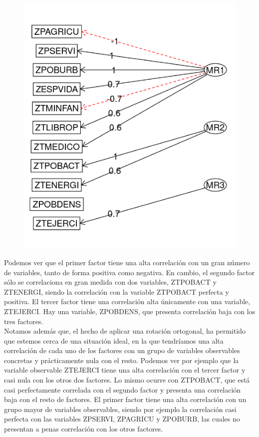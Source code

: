 \documentclass[11pt,a4paper]{article}
\begin{document}
                     \begin{figure}[H]
    	    \centering
    	    \includegraphics[scale=0.45]{plotaf.png}
    	    \caption{}
    	    \label{plotaf}
    	\end{figure}
    	
    Podemos ver que el primer factor tiene una alta correlación con un gran número de variables, tanto de forma positiva como negativa. En cambio, el segundo factor sólo se correlaciona en gran medida con dos variables, ZTPOBACT y ZTENERGI, siendo la correlación con la variable ZTPOBACT perfecta y positiva. El tercer factor tiene una correlación alta únicamente con una variable, ZTEJERCI. Hay una variable, ZPOBDENS, que presenta correlación baja con los tres factores. \\
    
    
     Notamos además que, el hecho de aplicar una rotación ortogonal, ha permitido que estemos cerca de una situación ideal, en la que tendríamos una alta correlación de cada uno de los factores con un grupo de variables observables concretas y prácticamente nula con el resto. Podemos ver por ejemplo que la variable observable ZTEJERCI tiene una alta correlación con el tercer factor y casi nula con los otros dos factores. Lo mismo ocurre con ZTPOBACT, que está casi perfectamente correlada con el segundo factor y presenta una correlación baja con el resto de factores. El primer factor tiene una alta correlación con un grupo mayor de variables observables, siendo por ejemplo la correlación casi perfecta con las variables ZPSERVI, ZPAGRICU y ZPOBURB, las cuales no presentan a penas correlación con los otros factores. \\
\end{document}
